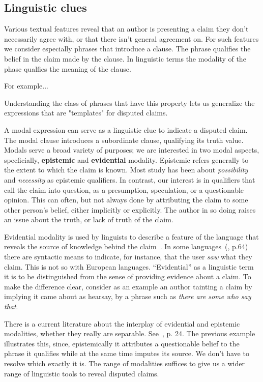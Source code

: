 \subsection{Linguistic clues}

Various textual features reveal that an author is presenting a claim 
they don't necessarily agree with, or that there isn't general agreement on. 
For such features we consider especially phrases that introduce a clause. The
phrase qualifies the belief in the claim made by the clause. In linguistic
terms the modality of the phase qualfies the meaning of the clause. 

For example...

Understanding the class of phrases that have this property lets us generalize
the expressions that are "templates" for disputed claims. 

A modal expression can serve as a linguistic clue to indicate a
disputed claim. The modal clause introduces a subordinate clause,
qualifying its truth value. Modals serve a broad variety of purposes;
we are interested in two modal aspects, specficially, {\bf epistemic}
and {\bf evidential} modality. Epistemic refers generally to the
extent to which the claim is known. Most study has been about {\it
possibility} and {\it necessity} as epistemic qualifiers. In
contrast, our interest is in qualifiers that call the claim into
question, as a presumption, speculation, or a questionable
opinion. This can often, but not always done by attributing the claim
to some other person's belief, either implicitly or explicitly. The
author in so doing raises an issue about the truth, or lack of truth
of the claim.

Evidential modality is used by linguists to describe a feature of the
language that reveals the source of knowledge behind the claim~\cite{Aikenvald.2006}.
In some languages~(\cite{Palmer.2001}, p.64) there are syntactic means 
to indicate, for instance, that the user {\it saw} what they claim. This is
not so with European languages. ``Evidential'' as a linguistic term it is to be
distinguished from the sense of providing evidence about a claim. To
make the difference clear, consider as an example an author tainting a claim by
implying it came about as hearsay, by a phrase such as {\it there are
some who say that}.

There is a current literature about the interplay of evidential and
epistemic modalities, whether they really are
separable. See~\cite{Palmer.2001}, p. 24. The previous example illustrates
this, since, epistemically it attributes a questionable belief to the
phrase it qualifies while at the same time imputes its source. We
don't have to resolve which exactly it is. The range of modalities
suffices to give us a wider range of linguistic tools to reveal
disputed claims.

 